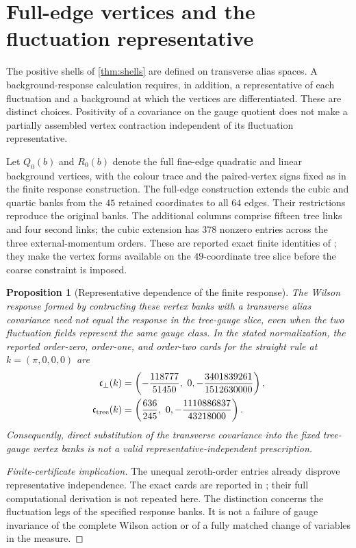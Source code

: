 \documentclass[11pt,oneside,openany]{book}
\newtheorem{proposition}[proposition]{Proposition}
\theoremstyle{definition}
\theoremstyle{remark}
\newcommand{\src}[2]{\cite[#2]{#1}}
\begin{document}
\section{Full-edge vertices and the fluctuation representative}
\label{sec:shell-functional}
The positive shells of \cref{thm:shells} are defined on transverse alias
spaces. A background-response calculation requires, in addition, a
representative of each fluctuation and a background at which the vertices
are differentiated. These are distinct choices. Positivity of a covariance
on the gauge quotient does not make a partially assembled vertex
contraction independent of its fluctuation representative.

Let $Q_0(b)$ and $R_0(b)$ denote the full fine-edge quadratic and linear
background vertices, with the colour trace and the paired-vertex signs
fixed as in the finite response construction. The full-edge construction
extends the cubic and quartic banks from the $45$ retained coordinates to
all $64$ edges. Their restrictions reproduce the original banks. The
additional columns comprise fifteen tree links and four second links; the
cubic extension has $378$ nonzero entries across the three
external-momentum orders. These are reported exact finite identities of
\src{F11}{V39}; they make the vertex forms available on the $49$-coordinate
tree slice before the coarse constraint is imposed.

\begin{proposition}[Representative dependence of the finite response]
\label{prop:representative-dependence}
The Wilson response formed by contracting these vertex banks with a
transverse alias covariance need not equal the response in the tree-gauge
slice, even when the two fluctuation fields represent the same gauge
class. In the stated normalization, the reported order-zero, order-one,
and order-two cards for the straight rule at $k=(\pi,0,0,0)$ are
\begin{align}
\mathfrak c_{\perp}(k)
 &=\left(-\frac{118777}{51450},\ 0,
          -\frac{3401839261}{1512630000}\right),
 \label{eq:transverse-corner}\\
\mathfrak c_{\rm tree}(k)
 &=\left(\frac{636}{245},\ 0,
          -\frac{1110886837}{43218000}\right).
 \label{eq:tree-corner}
\end{align}
Consequently, direct substitution of the transverse covariance into the
fixed tree-gauge vertex banks is not a valid representative-independent
prescription.
\end{proposition}
\begin{proof}[Finite-certificate implication]
The unequal zeroth-order entries already disprove representative
independence. The exact cards are reported in \src{F11}{V41}; their
full computational derivation is not repeated here. The distinction
concerns the fluctuation legs of the specified response banks. It is not a
failure of gauge invariance of the complete Wilson action or of a fully
matched change of variables in the measure.
\end{proof}
\end{document}
